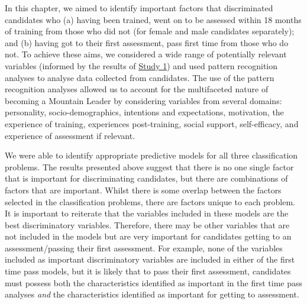 \documentclass[
  12pt,
  a4paper,
]{book}
\begin{document}
In this chapter, we aimed to identify important factors that discriminated candidates who (a) having been trained, went on to be assessed within 18 months of training from those who did not (for female and male candidates separately); and (b) having got to their first assessment, pass first time from those who do not. To achieve these aims, we considered a wide range of potentially relevant variables (informed by the results of \protect\hyperlink{ml-qualitative}{Study 1}) and used pattern recognition analyses to analyse data collected from candidates. The use of the pattern recognition analyses allowed us to account for the multifaceted nature of becoming a Mountain Leader by considering variables from several domains: personality, socio-demographics, intentions and expectations, motivation, the experience of training, experiences post-training, social support, self-efficacy, and experience of assessment if relevant.

We were able to identify appropriate predictive models for all three classification problems. The results presented above suggest that there is no one single factor that is important for discriminating candidates, but there are combinations of factors that are important. Whilst there is some overlap between the factors selected in the classification problems, there are factors unique to each problem. It is important to reiterate that the variables included in these models are the best discriminatory variables. Therefore, there may be other variables that are not included in the models but are very important for candidates getting to an assessment/passing their first assessment. For example, none of the variables included as important discriminatory variables are included in either of the first time pass models, but it is likely that to pass their first assessment, candidates must possess both the characteristics identified as important in the first time pass analyses \emph{and} the characteristics identified as important for getting to assessment.
\end{document}
